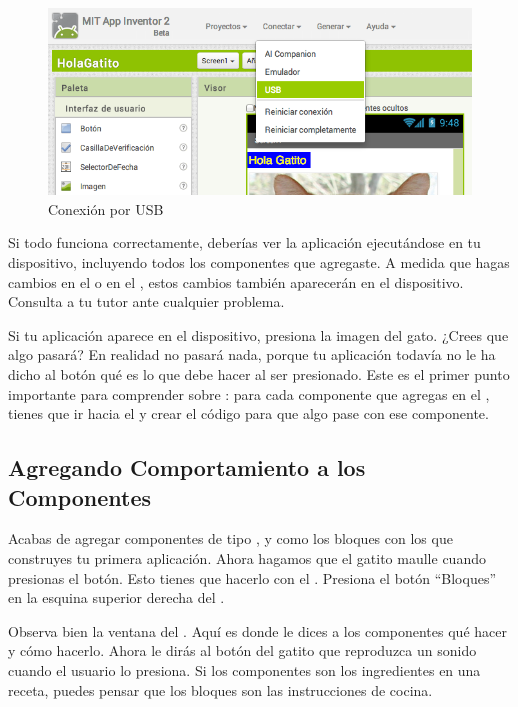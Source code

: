 \documentclass[letterpaper]{article}
\begin{document}
\begin{figure}[H]
\centering
\includegraphics[scale=0.25]{figures/ConectarUSB}
\caption{Conexión \AppInventor por USB}
\label{fig:conectarUSB}
\end{figure}

Si todo funciona correctamente, deberías ver la aplicación
 ejecutándose en tu dispositivo, incluyendo todos
los componentes que agregaste. A medida que hagas cambios en el
\componentDesigner o en el \blockEditor, estos cambios también
aparecerán en el dispositivo. Consulta a tu tutor ante cualquier
problema.

Si tu aplicación aparece en el dispositivo, presiona la imagen del
gato. ¿Crees que algo pasará? En realidad no pasará nada, porque tu
aplicación todavía no le ha dicho al botón qué es lo que debe hacer al
ser presionado. Este es el primer punto importante para comprender
sobre \AppInventor: para cada componente que agregas en el \designer,
tienes que ir hacia el \blockEditor y crear el código para que algo
pase con ese componente.

\subsection*{Agregando Comportamiento a los Componentes}

Acabas de agregar componentes de tipo ,
 y  como los bloques con los que
construyes tu primera aplicación. Ahora hagamos que el gatito maulle
cuando presionas el botón. Esto tienes que hacerlo con el
\blockEditor. Presiona el botón ``Bloques'' en la esquina superior
derecha del \componentDesigner.

Observa bien la ventana del \blockEditor. Aquí es donde le dices a los
componentes qué hacer y cómo hacerlo. Ahora le dirás al botón del
gatito que reproduzca un sonido cuando el usuario lo presiona. Si los
componentes son los ingredientes en una receta, puedes pensar que los
bloques son las instrucciones de cocina.
\end{document}
